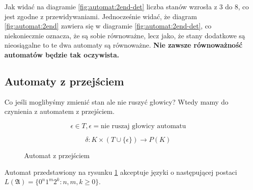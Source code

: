 \documentclass{../notatki}
\begin{document}
Jak widać na diagramie \ref{fig:automat:2end-det} liczba stanów wzrosła z 3 do 8, co jest zgodne z przewidywaniami.
Jednocześnie widać, że diagram \ref{fig:automat:2end} zawiera się w diagramie \ref{fig:automat:2end-det}, co niekoniecznie oznacza, że są sobie równoważne, lecz jako, że stany dodatkowe są nieosiągalne to te dwa automaty są równoważne.
\textbf{Nie zawsze równoważność automatów będzie tak oczywista.}

\subsection{Automaty z przejściem}

Co jeśli moglibyśmy zmienić stan ale nie ruszyć głowicy? Wtedy mamy do czynienia z automatem z przejściem.

$$
\epsilon \in T, \epsilon = \text{nie ruszaj głowicy automatu}
$$

$$
\delta: K \times (T \cup \{\epsilon\}) \rightarrow P(K)
$$

\begin{figure}[h!]
    \centering
    \caption{Automat z przejściem}
    \label{fig:automat:epsilon}
\end{figure}
Automat przedstawiony na rysunku \ref{fig:automat:epsilon} akceptuje języki o następującej postaci $L(\mathfrak{A})=\{0^n1^m2^k: n,m,k \ge 0\}$.
\end{document}
